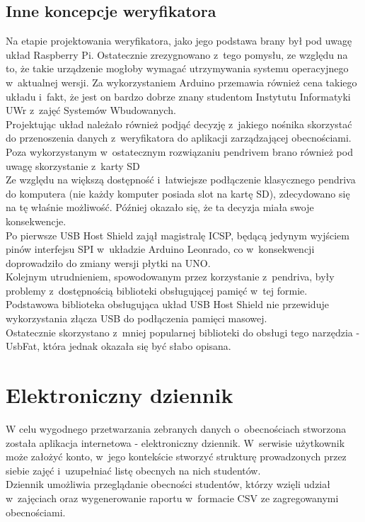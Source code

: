 \documentclass[declaration,shortabstract, mgr]{iithesis}
\begin{document}
\subsection{Inne koncepcje weryfikatora}
\indent Na etapie projektowania weryfikatora, jako jego podstawa brany był pod uwagę układ Raspberry Pi. Ostatecznie zrezygnowano z~tego pomysłu, ze względu na to, że takie urządzenie mogłoby wymagać utrzymywania systemu operacyjnego w~aktualnej wersji. Za wykorzystaniem Arduino przemawia również cena takiego układu i~fakt, że jest on bardzo dobrze znany studentom Instytutu Informatyki UWr z~zajęć Systemów Wbudowanych.\\
\indent Projektując układ należało również podjąć decyzję z~jakiego nośnika skorzystać do przenoszenia danych z~weryfikatora do aplikacji zarządzającej obecnościami. Poza wykorzystanym w~ostatecznym rozwiązaniu pendrivem brano również pod uwagę skorzystanie z~karty SD \\
\indent Ze względu na większą dostępność i~łatwiejsze podłączenie klasycznego pendriva do komputera (nie każdy komputer posiada slot na kartę SD), zdecydowano się na tę właśnie możliwość. Później okazało się, że ta decyzja miała swoje konsekwencje.\\
\indent Po pierwsze USB Host Shield zajął magistralę ICSP, będącą jedynym wyjściem pinów interfejsu SPI w~układzie Arduino Leonrado, co w~konsekwencji doprowadziło do zmiany wersji płytki na UNO. \\
\indent Kolejnym utrudnieniem, spowodowanym przez korzystanie z~pendriva, były problemy z~dostępnością biblioteki obsługującej pamięć w~tej formie. Podstawowa biblioteka obsługująca układ USB Host Shield nie przewiduje wykorzystania złącza USB do podłączenia pamięci masowej. \\
\indent Ostatecznie skorzystano z~mniej popularnej biblioteki do obsługi tego narzędzia - UsbFat\cite{usbfat}, która jednak okazała się być słabo opisana.

\section{Elektroniczny dziennik}
\indent W celu wygodnego przetwarzania zebranych danych o~obecnościach stworzona została aplikacja internetowa - elektroniczny dziennik. W~serwisie użytkownik może założyć konto, w~jego kontekście stworzyć strukturę prowadzonych przez siebie zajęć i~uzupełniać listę obecnych na nich studentów.\\
\indent Dziennik umożliwia przeglądanie obecności studentów, którzy wzięli udział w~zajęciach oraz wygenerowanie raportu w~formacie CSV ze zagregowanymi obecnościami.
\end{document}
